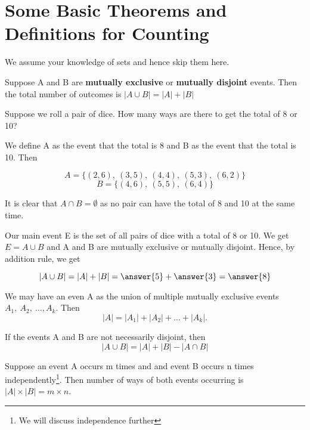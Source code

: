 \documentclass{ximera}
\begin{document}
\hspace{1cm}


\section*{Some Basic Theorems and Definitions for Counting}

We assume your knowledge of sets and hence skip them here.

\begin{theorem}
Suppose A and B are \textbf{mutually exclusive} or \textbf{mutually disjoint}  events. Then the total number of outcomes is $|A\cup B|=|A|+|B|$
\end{theorem}

\begin{example}
Suppose we roll a pair of dice. How many ways are there to get the total of 8 or 10?

\begin{explanation}
We define A as the event that the total is 8 and B as the event that the total is 10. Then 

$$A=\{(2,6),~(3,5),~(4,4),~(5,3),~(6,2)\}$$
$$B=\{(4,6),~(5,5),~(6,4)\}$$

It is clear that $A\cap B=\emptyset$ as no pair can have the total of 8 and 10 at the same time.

Our main event E is the set of all pairs of dice with a total of 8 or 10. We get $E=A\cup B$ and A and B are mutually exclusive or mutually disjoint. Hence, by addition rule, we get

$$|A\cup B|=|A|+|B|=\answer{5}+\answer{3}=\answer{8}$$
\end{explanation}

\begin{remark}
We may have an even A as the union of multiple mutually exclusive events $A_1,~ A_2, ~\ldots, A_k$. Then 
$$|A|=|A_1|+|A_2|+\ldots+|A_k|.$$
\end{remark}

\begin{remark}
If the events A and B are not necessarily disjoint, then 
$$|A\cup B|=|A|+|B|-|A\cap B|$$
\end{remark}
\end{example}


\begin{theorem}
Suppose an event A occurs m times and and event B occurs n times independently\footnote{We will discuss independence further}. Then number of ways of both events occurring is $|A|\times |B|=m\times n$.
\end{theorem}
\end{document}

